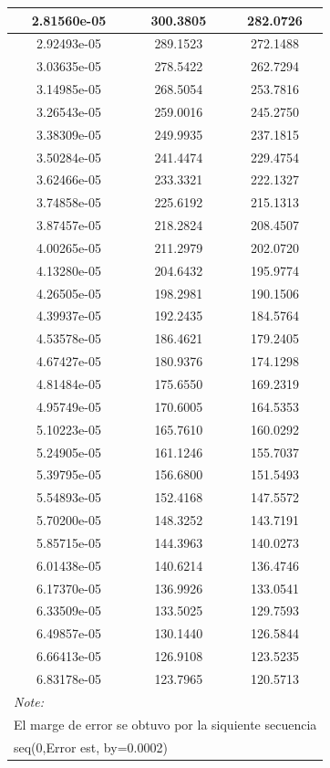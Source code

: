 \documentclass[
]{article}
\begin{document}
\begin{table}[!h]
\begin{tabular}[t]{c|c|c}
\hline
\rowcolor{gray!6}  2.81560e-05 & 300.3805 & 282.0726\\
\hline
2.92493e-05 & 289.1523 & 272.1488\\
\hline
\rowcolor{gray!6}  3.03635e-05 & 278.5422 & 262.7294\\
\hline
3.14985e-05 & 268.5054 & 253.7816\\
\hline
\rowcolor{gray!6}  3.26543e-05 & 259.0016 & 245.2750\\
\hline
3.38309e-05 & 249.9935 & 237.1815\\
\hline
\rowcolor{gray!6}  3.50284e-05 & 241.4474 & 229.4754\\
\hline
3.62466e-05 & 233.3321 & 222.1327\\
\hline
\rowcolor{gray!6}  3.74858e-05 & 225.6192 & 215.1313\\
\hline
3.87457e-05 & 218.2824 & 208.4507\\
\hline
\rowcolor{gray!6}  4.00265e-05 & 211.2979 & 202.0720\\
\hline
4.13280e-05 & 204.6432 & 195.9774\\
\hline
\rowcolor{gray!6}  4.26505e-05 & 198.2981 & 190.1506\\
\hline
4.39937e-05 & 192.2435 & 184.5764\\
\hline
\rowcolor{gray!6}  4.53578e-05 & 186.4621 & 179.2405\\
\hline
4.67427e-05 & 180.9376 & 174.1298\\
\hline
\rowcolor{gray!6}  4.81484e-05 & 175.6550 & 169.2319\\
\hline
4.95749e-05 & 170.6005 & 164.5353\\
\hline
\rowcolor{gray!6}  5.10223e-05 & 165.7610 & 160.0292\\
\hline
5.24905e-05 & 161.1246 & 155.7037\\
\hline
\rowcolor{gray!6}  5.39795e-05 & 156.6800 & 151.5493\\
\hline
5.54893e-05 & 152.4168 & 147.5572\\
\hline
\rowcolor{gray!6}  5.70200e-05 & 148.3252 & 143.7191\\
\hline
5.85715e-05 & 144.3963 & 140.0273\\
\hline
\rowcolor{gray!6}  6.01438e-05 & 140.6214 & 136.4746\\
\hline
6.17370e-05 & 136.9926 & 133.0541\\
\hline
\rowcolor{gray!6}  6.33509e-05 & 133.5025 & 129.7593\\
\hline
6.49857e-05 & 130.1440 & 126.5844\\
\hline
\rowcolor{gray!6}  6.66413e-05 & 126.9108 & 123.5235\\
\hline
6.83178e-05 & 123.7965 & 120.5713\\
\hline
\multicolumn{3}{l}{\textit{Note: }}\\
\multicolumn{3}{l}{El marge de error se obtuvo por la siquiente secuencia}\\
\multicolumn{3}{l}{seq(0,Error est, by=0.0002)}\\
\end{tabular}
\end{table}
\end{document}
